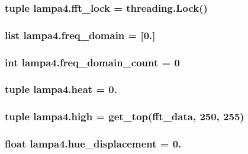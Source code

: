 \subsubsection[{fft\+\_\+lock}]{\setlength{\rightskip}{0pt plus 5cm}tuple lampa4.\+fft\+\_\+lock = threading.\+Lock()}\label{namespacelampa4_a81b2d75595cdc20eb54c714c56bfd08f}
\hypertarget{namespacelampa4_a369a8a502d6759251af2acd22c697570}{}
\subsubsection[{freq\+\_\+domain}]{\setlength{\rightskip}{0pt plus 5cm}list lampa4.\+freq\+\_\+domain = \mbox{[}0.\mbox{]}}\label{namespacelampa4_a369a8a502d6759251af2acd22c697570}
\hypertarget{namespacelampa4_a58a7d2d077bc3d30265e199521b68f65}{}
\subsubsection[{freq\+\_\+domain\+\_\+count}]{\setlength{\rightskip}{0pt plus 5cm}int lampa4.\+freq\+\_\+domain\+\_\+count = 0}\label{namespacelampa4_a58a7d2d077bc3d30265e199521b68f65}
\hypertarget{namespacelampa4_a93128f48d4412f365a71aa12b3994732}{}
\subsubsection[{heat}]{\setlength{\rightskip}{0pt plus 5cm}tuple lampa4.\+heat = 0.}\label{namespacelampa4_a93128f48d4412f365a71aa12b3994732}
\hypertarget{namespacelampa4_a9b2d9b19816e848a68cbc261d8ded396}{}
\subsubsection[{high}]{\setlength{\rightskip}{0pt plus 5cm}tuple lampa4.\+high = {\bf get\+\_\+top}({\bf fft\+\_\+data}, 250, 255)}\label{namespacelampa4_a9b2d9b19816e848a68cbc261d8ded396}
\hypertarget{namespacelampa4_a9dd69141d6b812cd877ac90a67624691}{}
\subsubsection[{hue\+\_\+displacement}]{\setlength{\rightskip}{0pt plus 5cm}float lampa4.\+hue\+\_\+displacement = 0.}\label{namespacelampa4_a9dd69141d6b812cd877ac90a67624691}
\hypertarget{namespacelampa4_aa1a8ba53cf446fec1b46e2dc8a9dcf15}{}
